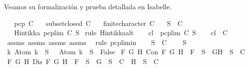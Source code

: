 \begin{isabellebody}
\begin{isamarkuptext}
  Veamos su formalización y prueba detallada en Isabelle.%
\end{isamarkuptext}\isamarkuptrue%
\isamarkupfalse%
\isanewline
\ \ \ {\isachardoublequoteopen}pcp\ C{\isachardoublequoteclose}\isanewline
\ \ \ {\isachardoublequoteopen}subset{\isacharunderscore}closed\ C{\isachardoublequoteclose}\isanewline
\ \ \ {\isachardoublequoteopen}finite{\isacharunderscore}character\ C{\isachardoublequoteclose}\isanewline
\ \ \ {\isachardoublequoteopen}S\ {\isasymin}\ C{\isachardoublequoteclose}\isanewline
\ \ \ {\isachardoublequoteopen}Hintikka\ {\isacharparenleft}pcp{\isacharunderscore}lim\ C\ S{\isacharparenright}{\isachardoublequoteclose}\isanewline
%
\isadelimproof
%
\endisadelimproof
%
\isatagproof
{}\isamarkupfalse%
\ {\isacharparenleft}rule\ Hintikka{\isacharunderscore}alt{}{\isacharparenright}\isanewline
\ \ \isamarkupfalse%
\ {\isacharquery}cl\ {\isacharequal}\ {\isachardoublequoteopen}pcp{\isacharunderscore}lim\ C\ S{\isachardoublequoteclose}\isanewline
\ \ \isamarkupfalse%
\ {\isachardoublequoteopen}{\isacharquery}cl\ {\isasymin}\ C{\isachardoublequoteclose}\isanewline
\ \ \ \ \isamarkupfalse%
\ assms{\isacharparenleft}{}{\isacharparenright}\ assms{\isacharparenleft}{}{\isacharparenright}\ assms{\isacharparenleft}{}{\isacharparenright}\ assms{\isacharparenleft}{}{\isacharparenright}\ \isamarkupfalse%
\ {\isacharparenleft}rule\ pcp{\isacharunderscore}lim{\isacharunderscore}in{\isacharparenright}\isanewline
\ \ \isamarkupfalse%
\ {\isachardoublequoteopen}{\isacharparenleft}{\isasymforall}S\ {\isasymin}\ C{\isachardot}\isanewline
\ \ {\isasymbottom}\ {\isasymnotin}\ S\isanewline
{\isasymand}\ {\isacharparenleft}{\isasymforall}k{\isachardot}\ Atom\ k\ {\isasymin}\ S\ {\isasymlongrightarrow}\ \isactrlbold {\isasymnot}\ {\isacharparenleft}Atom\ k{\isacharparenright}\ {\isasymin}\ S\ {\isasymlongrightarrow}\ False{\isacharparenright}\isanewline
{\isasymand}\ {\isacharparenleft}{\isasymforall}F\ G\ H{\isachardot}\ Con\ F\ G\ H\ {\isasymlongrightarrow}\ F\ {\isasymin}\ S\ {\isasymlongrightarrow}\ {\isacharbraceleft}G{\isacharcomma}H{\isacharbraceright}\ {\isasymunion}\ S\ {\isasymin}\ C{\isacharparenright}\isanewline
{\isasymand}\ {\isacharparenleft}{\isasymforall}F\ G\ H{\isachardot}\ Dis\ F\ G\ H\ {\isasymlongrightarrow}\ F\ {\isasymin}\ S\ {\isasymlongrightarrow}\ {\isacharbraceleft}G{\isacharbraceright}\ {\isasymunion}\ S\ {\isasymin}\ C\ {\isasymor}\ {\isacharbraceleft}H{\isacharbraceright}\ {\isasymunion}\ S\ {\isasymin}\ C{\isacharparenright}{\isacharparenright}{\isachardoublequoteclose}\isanewline

\end{isabellebody}
